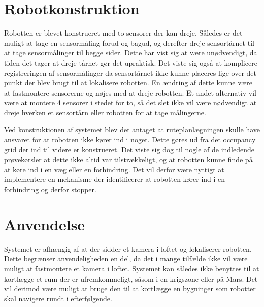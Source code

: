 \section{Robotkonstruktion}
Robotten er blevet konstrueret med to sensorer der kan dreje. 
Således er det muligt at tage en sensormåling forud og bagud, og derefter dreje sensortårnet til at tage sensormålinger til begge sider.
Dette har vist sig at være unødvendigt, da tiden det tager at dreje tårnet gør det upraktisk.
Det viste sig også at komplicere registreringen af sensormålinger da sensortårnet ikke kunne placeres lige over det punkt der blev brugt til at lokalisere robotten.
En ændring af dette kunne være at fastmontere sensorerne og nøjes med at dreje robotten.
Et andet alternativ vil være at montere 4 sensorer i stedet for to, så det slet ikke vil være nødvendigt at dreje hverken et sensortårn eller robotten for at tage målingerne.

Ved konstruktionen af systemet blev det antaget at ruteplanlægningen skulle have ansvaret for at robotten ikke kører ind i noget. 
Dette gøres ud fra det occupancy grid der ind til videre er konstrueret.
Det viste sig dog til nogle af de indledende prøvekørsler at dette ikke altid var tilstrækkeligt, og at robotten kunne finde på at køre ind i en væg eller en forhindring.
Det vil derfor være nyttigt at implementere en mekanisme der identificerer at robotten kører ind i en forhindring og derfor stopper. 

\section{Anvendelse}
Systemet er afhængig af at der sidder et kamera i loftet og lokaliserer robotten. 
Dette begrænser anvendeligheden en del, da det i mange tilfælde ikke vil være muligt at fastmontere et kamera i loftet.
Systemet kan således ikke benyttes til at kortlægge et rum der er ufremkommeligt, såsom i en krigszone eller på Mars.
Det vil derimod være muligt at bruge den til at kortlægge en bygninger som robotter skal navigere rundt i efterfølgende.